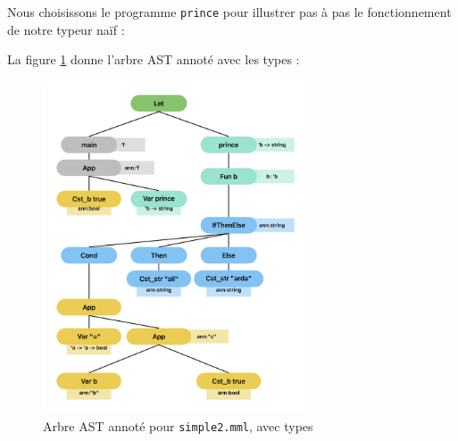 Nous choisissons le programme \texttt{prince} pour illustrer pas à pas le fonctionnement de notre typeur naïf :

La figure \ref{fig:TypageEx2Graph} donne l’arbre AST annoté avec les types :

\begin{figure}[!ht]
    \centering
    \includegraphics[width=0.7\textwidth]{images/TypageEx2Graph.jpg}
    \caption{Arbre AST annoté pour \texttt{simple2.mml}, avec types}
    \label{fig:TypageEx2Graph}
\end{figure}

